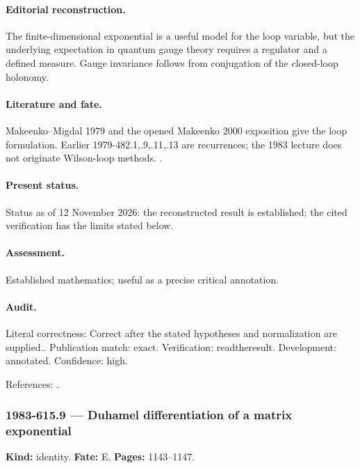 \paragraph{Editorial reconstruction.} The finite-dimensional exponential is a useful model for the loop variable, but the underlying expectation in quantum gauge theory requires a regulator and a defined measure. Gauge invariance follows from conjugation of the closed-loop holonomy.

\paragraph{Literature and fate.} Makeenko--Migdal 1979 and the opened Makeenko 2000 exposition give the loop formulation. Earlier 1979-482.1,.9,.11,.13 are recurrences; the 1983 lecture does not originate Wilson-loop methods. \citep{makeenkomigdal1979exact,makeenko2000large}.

\paragraph{Present status.} Status as of 12 November 2026: the reconstructed result is established; the cited verification has the limits stated below.

\paragraph{Assessment.} Established mathematics; useful as a precise critical annotation.

\paragraph{Audit.} Literal correctness: Correct after the stated hypotheses and normalization are supplied.. Publication match: exact. Verification: readtheresult. Development: annotated. Confidence: high.

\noindent References: \citep{makeenkomigdal1979exact,makeenko2000large}.\par

\subsubsection{1983-615.9 --- Duhamel differentiation of a matrix exponential}

\label{item:1983-615.9}

\noindent\textbf{Kind:} identity. \textbf{Fate:} E. \textbf{Pages:} 1143--1147.\par

